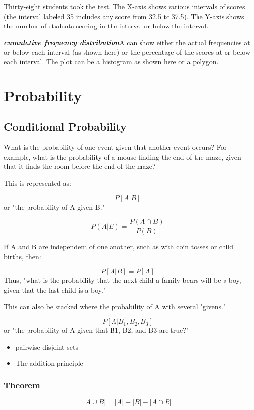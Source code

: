 \documentclass[12pt]{report}
\begin{document}
{ \Large
	Thirty-eight students took the test. The X-axis shows various intervals of scores (the interval labeled 35 includes any score from 32.5 to 37.5). The Y-axis shows the number of students scoring in the interval or below the interval.
	
	\textbf{\emph{cumulative frequency distribution}}A  can show either the actual frequencies at or below each interval (as shown here) or the percentage of the scores at or below each interval. The plot can be a histogram as shown here or a polygon.
}




\chapter{Probability}
\Large
\section{Conditional Probability}
What is the probability of one event given that another event occurs? For example, what is the probability of a mouse finding the end of the maze, given that it finds the room before the end of the maze?

This is represented as:


\[P[A | B]\]
or "the probability of A given B."

\[P(A | B) = \frac{P(A\cap B)}{P(B)}\]

If A and B are independent of one another, such as with coin tosses or child births, then:


\[P[A | B] = P[ A ]\]
Thus, "what is the probability that the next child a family bears will be a boy, given that the last child is a boy."

This can also be stacked where the probability of A with several "givens."


\[P[A | B_1, B_2, B_3 ]\]
or "the probability of A given that B1, B2, and B3 are true?"


		
		\begin{itemize}
			\item pairwise disjoint sets
			\item The addition principle
		\end{itemize}
		\subsection*{Theorem}
		\[ |A \cup B| = |A| + |B| - |A \cap B|  \]
		
\end{document}

